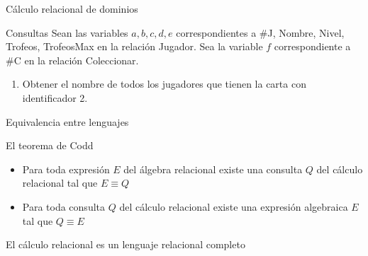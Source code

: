 \begin{frame}{C\'alculo relacional de dominios}
    
    \begin{block}{Consultas}
        Sean las variables $a, b, c ,d ,e$ correspondientes a \#J, Nombre, Nivel, Trofeos, TrofeosMax en la relaci\'on Jugador.
        Sea la variable $f$ correspondiente a \#C en la relaci\'on Coleccionar.
        \begin{enumerate}
            \item Obtener el nombre de todos los jugadores que tienen la carta con identificador 2.
                
            
        \end{enumerate}

        
        
    \end{block}

\end{frame}


\begin{frame}{Equivalencia entre lenguajes}
    \begin{block}{El teorema de Codd}
        \begin{itemize}
            \item Para toda expresi\'on $E$ del \'algebra
            relacional existe una consulta $Q$ del c\'alculo relacional
            tal que $E \equiv  Q$
            \item Para toda consulta $Q$ del c\'alculo
            relacional existe una expresi\'on algebraica $E$ 
            tal que $Q \equiv  E$
        \end{itemize}

        El c\'alculo relacional es un lenguaje relacional completo
    \end{block}

\end{frame}


